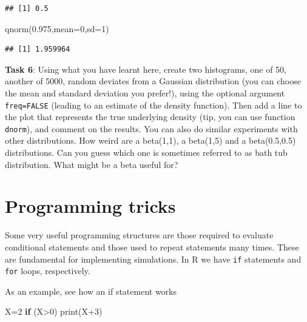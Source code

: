\documentclass[
]{article}
\newenvironment{Shaded}{\begin{snugshade}}{\end{snugshade}}
\newcommand{\AttributeTok}[1]{\textcolor[rgb]{0.77,0.63,0.00}{#1}}
\newcommand{\ControlFlowTok}[1]{\textcolor[rgb]{0.13,0.29,0.53}{\textbf{#1}}}
\newcommand{\DecValTok}[1]{\textcolor[rgb]{0.00,0.00,0.81}{#1}}
\newcommand{\FloatTok}[1]{\textcolor[rgb]{0.00,0.00,0.81}{#1}}
\newcommand{\FunctionTok}[1]{\textcolor[rgb]{0.00,0.00,0.00}{#1}}
\newcommand{\NormalTok}[1]{#1}
\newcommand{\OtherTok}[1]{\textcolor[rgb]{0.56,0.35,0.01}{#1}}
\newcommand{\SpecialCharTok}[1]{\textcolor[rgb]{0.00,0.00,0.00}{#1}}
\begin{document}
\begin{verbatim}
## [1] 0.5
\end{verbatim}

\begin{Shaded}
\begin{Highlighting}[]
\FunctionTok{qnorm}\NormalTok{(}\FloatTok{0.975}\NormalTok{,}\AttributeTok{mean=}\DecValTok{0}\NormalTok{,}\AttributeTok{sd=}\DecValTok{1}\NormalTok{)}
\end{Highlighting}
\end{Shaded}

\begin{verbatim}
## [1] 1.959964
\end{verbatim}

\textbf{Task 6}: Using what you have learnt here, create two histograms,
one of 50, another of 5000, random deviates from a Gaussian distribution
(you can choose the mean and standard deviation you prefer!), using the
optional argument \texttt{freq=FALSE} (leading to an estimate of the
density function). Then add a line to the plot that represents the true
underlying density (tip, you can use function \texttt{dnorm}), and
comment on the results. You can also do similar experiments with other
distributions. How weird are a beta(1,1), a beta(1,5) and a
beta(0.5,0.5) distributions. Can you guess which one is sometimes
referred to as bath tub distribution. What might be a beta useful for?

\hypertarget{programming-tricks}{%
\section{Programming tricks}\label{programming-tricks}}

Some very useful programming structures are those required to evaluate
conditional statements and those used to repeat statements many times.
These are fundamental for implementing simulations. In R we have
\texttt{if} statements and \texttt{for} loops, respectively.

As an example, see how an if statement works

\begin{Shaded}
\begin{Highlighting}[]
\NormalTok{X}\OtherTok{=}\DecValTok{2}
\ControlFlowTok{if}\NormalTok{ (X}\SpecialCharTok{\textgreater{}}\DecValTok{0}\NormalTok{) }\FunctionTok{print}\NormalTok{(X}\SpecialCharTok{+}\DecValTok{3}\NormalTok{)}
\end{Highlighting}
\end{Shaded}
\end{document}
